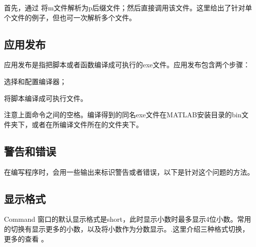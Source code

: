 首先，通过  将m文件解析为p后缀文件；然后直接调用该文件。这里给出了针对单个文件的例子，但也可一次解析多个文件。

\vspace{-0.8cm}







\subsection{应用发布}

应用发布是指把脚本或者函数编译成可执行的exe文件。应用发布包含两个步骤：

 \begindot
  \item {} 选择和配置编译器；
  \item {} 将脚本编译成可执行文件。
 \myenddot

注意上面命令之间的空格。编译得到的同名exe文件在MATLAB安装目录的bin文件夹下，或者在所编译文件所在的文件夹下。





\subsection{警告和错误}

在编写程序时，会用一些输出来标识警告或者错误，以下是针对这个问题的方法。

\vspace{-0.8cm}


\vspace{-0.8cm}


\vspace{-0.8cm}







\subsection{显示格式}

Command 窗口的默认显示格式是short，此时显示小数时最多显示4位小数。常用的切换有显示更多的小数，以及将小数作为分数显示。.这里介绍三种格式切换，更多的查看 。

\vspace{-0.8cm}
